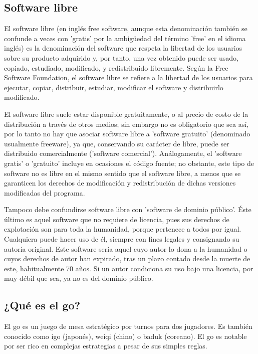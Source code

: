 \documentclass[12pt,a4paper]{report}
\begin{document}
\subsection{Software libre}

El software libre (en inglés free software, aunque esta denominación también se
confunde a veces con 'gratis' por la ambigüedad del término 'free' en el idioma
inglés) es la denominación del software que respeta la libertad de los usuarios
sobre su producto adquirido y, por tanto, una vez obtenido puede ser usado,
copiado, estudiado, modificado, y redistribuido libremente. Según la Free
Software Foundation, el software libre se refiere a la libertad de los usuarios
para ejecutar, copiar, distribuir, estudiar, modificar el software y
distribuirlo modificado.

El software libre suele estar disponible gratuitamente, o al precio de costo de
la distribución a través de otros medios; sin embargo no es obligatorio que sea
así, por lo tanto no hay que asociar software libre a 'software gratuito'
(denominado usualmente freeware), ya que, conservando su carácter de libre,
puede ser distribuido comercialmente ('software comercial'). Análogamente, el
'software gratis' o 'gratuito' incluye en ocasiones el código fuente; no
obstante, este tipo de software no es libre en el mismo sentido que el software
libre, a menos que se garanticen los derechos de modificación y redistribución
de dichas versiones modificadas del programa.

Tampoco debe confundirse software libre con 'software de dominio público'. Éste
último es aquel software que no requiere de licencia, pues sus derechos de
explotación son para toda la humanidad, porque pertenece a todos por igual.
Cualquiera puede hacer uso de él, siempre con fines legales y consignando su
autoría original. Este software sería aquel cuyo autor lo dona a la humanidad o
cuyos derechos de autor han expirado, tras un plazo contado desde la muerte de
este, habitualmente 70 años. Si un autor condiciona su uso bajo una licencia,
por muy débil que sea, ya no es del dominio público.


\subsection{¿Qué es el go?}

El go es un juego de mesa estratégico por turnos para dos jugadores. Es 
también conocido como igo (japonés), weiqi (chino) o baduk (coreano). El go 
es notable por ser rico en complejas estrategias a pesar de sus simples reglas.
\end{document}
